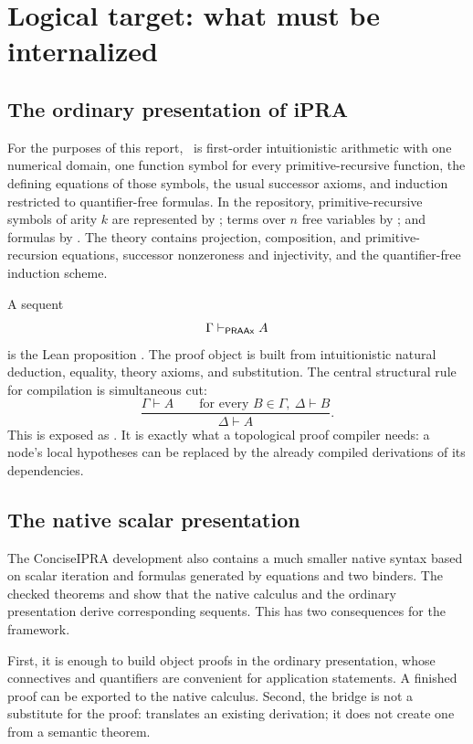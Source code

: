\section{Logical target: what must be internalized}

\subsection{The ordinary presentation of iPRA}

For the purposes of this report, \iPRA\ is first-order intuitionistic arithmetic with one numerical domain, one function symbol for every primitive-recursive function, the defining equations of those symbols, the usual successor axioms, and induction restricted to quantifier-free formulas.  In the repository, primitive-recursive symbols of arity \(k\) are represented by ; terms over \(n\) free variables by ; and formulas by .  The theory  contains projection, composition, and primitive-recursion equations, successor nonzeroness and injectivity, and the quantifier-free induction scheme.

A sequent
\[
 \Gamma\vdash_{\mathsf{PRAAx}} A
\]
is the Lean proposition .  The proof object is built from intuitionistic natural deduction, equality, theory axioms, and substitution.  The central structural rule for compilation is simultaneous cut:
\[
 \frac{\Gamma\vdash A \qquad \text{for every }B\in\Gamma,\ \Delta\vdash B}
      {\Delta\vdash A}.
\]
This is exposed as .  It is exactly what a topological proof compiler needs: a node's local hypotheses can be replaced by the already compiled derivations of its dependencies.

\subsection{The native scalar presentation}

The ConciseIPRA development also contains a much smaller native syntax based on scalar iteration and formulas generated by equations and two binders.  The checked theorems  and  show that the native calculus and the ordinary presentation derive corresponding sequents.  This has two consequences for the framework.

First, it is enough to build object proofs in the ordinary presentation, whose connectives and quantifiers are convenient for application statements.  A finished proof can be exported to the native calculus.  Second, the bridge is not a substitute for the proof:  translates an existing derivation; it does not create one from a semantic theorem.

